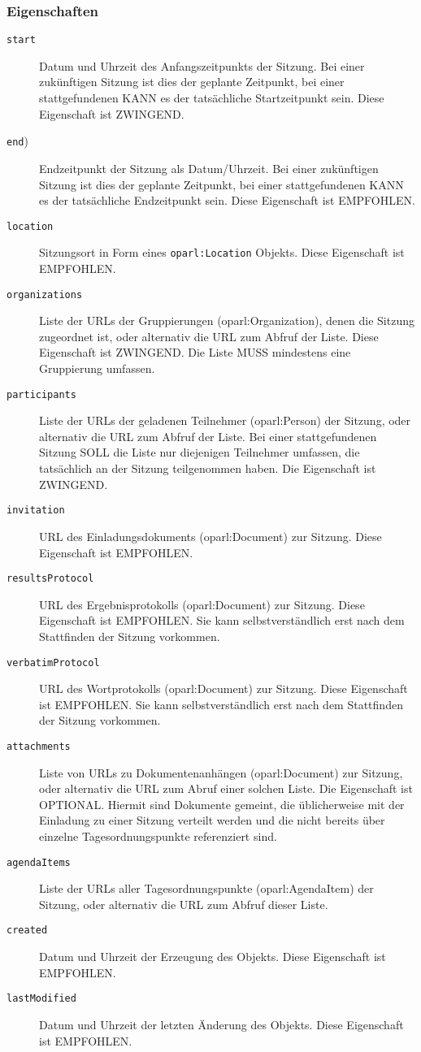 \documentclass[,a4paper]{article}
\begin{document}
\subsubsection{Eigenschaften}\label{eigenschaften-4}

\begin{description}
\item[\texttt{start}]
Datum und Uhrzeit des Anfangszeitpunkts der Sitzung. Bei einer
zukünftigen Sitzung ist dies der geplante Zeitpunkt, bei einer
stattgefundenen KANN es der tatsächliche Startzeitpunkt sein. Diese
Eigenschaft ist ZWINGEND.
\item[\texttt{end})]
Endzeitpunkt der Sitzung als Datum/Uhrzeit. Bei einer zukünftigen
Sitzung ist dies der geplante Zeitpunkt, bei einer stattgefundenen KANN
es der tatsächliche Endzeitpunkt sein. Diese Eigenschaft ist EMPFOHLEN.
\item[\texttt{location}]
Sitzungsort in Form eines \texttt{oparl:Location} Objekts. Diese
Eigenschaft ist EMPFOHLEN.
\item[\texttt{organizations}]
Liste der URLs der Gruppierungen (oparl:Organization), denen die Sitzung
zugeordnet ist, oder alternativ die URL zum Abfruf der Liste. Diese
Eigenschaft ist ZWINGEND. Die Liste MUSS mindestens eine Gruppierung
umfassen.
\item[\texttt{participants}]
Liste der URLs der geladenen Teilnehmer (oparl:Person) der Sitzung, oder
alternativ die URL zum Abfruf der Liste. Bei einer stattgefundenen
Sitzung SOLL die Liste nur diejenigen Teilnehmer umfassen, die
tatsächlich an der Sitzung teilgenommen haben. Die Eigenschaft ist
ZWINGEND.
\item[\texttt{invitation}]
URL des Einladungsdokuments (oparl:Document) zur Sitzung. Diese
Eigenschaft ist EMPFOHLEN.
\item[\texttt{resultsProtocol}]
URL des Ergebnisprotokolls (oparl:Document) zur Sitzung. Diese
Eigenschaft ist EMPFOHLEN. Sie kann selbstverständlich erst nach dem
Stattfinden der Sitzung vorkommen.
\item[\texttt{verbatimProtocol}]
URL des Wortprotokolls (oparl:Document) zur Sitzung. Diese Eigenschaft
ist EMPFOHLEN. Sie kann selbstverständlich erst nach dem Stattfinden der
Sitzung vorkommen.
\item[\texttt{attachments}]
Liste von URLs zu Dokumentenanhängen (oparl:Document) zur Sitzung, oder
alternativ die URL zum Abruf einer solchen Liste. Die Eigenschaft ist
OPTIONAL. Hiermit sind Dokumente gemeint, die üblicherweise mit der
Einladung zu einer Sitzung verteilt werden und die nicht bereits über
einzelne Tagesordnungspunkte referenziert sind.
\item[\texttt{agendaItems}]
Liste der URLs aller Tagesordnungspunkte (oparl:AgendaItem) der Sitzung,
oder alternativ die URL zum Abfruf dieser Liste.
\item[\texttt{created}]
Datum und Uhrzeit der Erzeugung des Objekts. Diese Eigenschaft ist
EMPFOHLEN.
\item[\texttt{lastModified}]
Datum und Uhrzeit der letzten Änderung des Objekts. Diese Eigenschaft
ist EMPFOHLEN.
\end{description}
\end{document}
